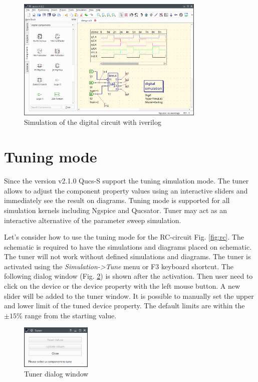 \documentclass[a4paper,12pt]{article}
\begin{document}
    \begin{figure}[!ht]
    \begin{center}
        \includegraphics[width=0.8\textwidth]{img/demux.png}
    \end{center}
    \caption{Simulation of the digital circuit with iverilog} \label{fig:demux}
    \end{figure}


\section{Tuning mode}

Since the version v2.1.0 Qucs-S support the tuning simulation mode. The tuner allows to adjust the component property values using an interactive sliders and immediately see the result on diagrams. Tuning mode is supported for all simulation kernels including Ngspice and Qucsator. Tuner may act as an interactive alternative of the parameter sweep simulation.

Let's consider how to use the tuning mode for the RC-circuit Fig. \ref{fig:rc}. The schematic is required to have the simulations and diagrams placed on schematic. The tuner will not work without defined simulations and diagrams. The tuner is activated using the \emph{Simulation->Tune} menu or F3 keyboard shortcut. The following dialog window (Fig. \ref{fig:tuner_dlg}) is shown after the activation. Then user need to click on the device or the device property with the left mouse button. A new slider will be added to the tuner window. It is possible to manually set the upper and lower limit of the tuned device property. The default limits are within the $\pm15\%$ range from the starting value.  



    \begin{figure}[!ht]
    \begin{center}
        \includegraphics[width=0.3\textwidth]{img/tuner_dlg.png}
    \end{center}
    \caption{Tuner dialog window} \label{fig:tuner_dlg}
    \end{figure}
    
\end{document}
